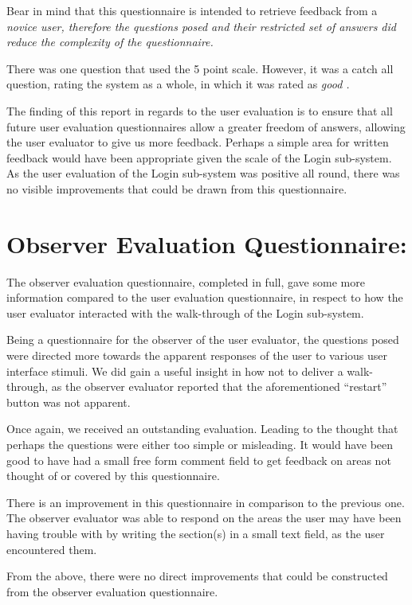 Bear in mind that this questionnaire is intended to retrieve feedback from a
\it novice \rm user, therefore the questions posed and their restricted
set of answers did reduce the complexity of the questionnaire.

There was one question that used the 5 point scale. However, it was a catch all
question, rating the system as a whole, in which it was rated as \it good \rm.

The finding of this report in regards to the user evaluation is to ensure that
all future user evaluation questionnaires allow a greater freedom of answers,
allowing the user evaluator to give us more feedback. Perhaps a simple area
for written feedback would have been appropriate given the scale of the Login
sub-system. As the user evaluation of the Login sub-system was positive all
round, there was no visible improvements that could be drawn from this
questionnaire.

\section {
	Observer Evaluation Questionnaire:
}

The observer evaluation questionnaire, completed in full, gave some more
information compared to the user evaluation questionnaire, in respect to how
the user evaluator interacted with the walk-through of the Login sub-system.

Being a questionnaire for the observer of the user evaluator, the questions
posed were directed more towards the apparent responses of the user to various
user interface stimuli. We did gain a useful insight in how not to deliver
a walk-through, as the observer evaluator reported that the aforementioned
``restart'' button was not apparent.

Once again, we received an outstanding evaluation. Leading to the thought that
perhaps the questions were either too simple or misleading. It would have been
good to have had a small free form comment field to get feedback on areas not
thought of or covered by this questionnaire.

There is an improvement in this questionnaire in comparison to the previous one.
The observer evaluator was able to respond on the areas the user may have
been having trouble with by writing the section(s) in a small text field, as the
user encountered them.

From the above, there were no direct improvements that could be constructed from
the observer evaluation questionnaire.

